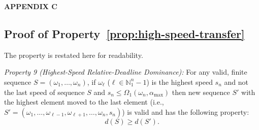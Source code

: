
\centerline{\large\bf APPENDIX C}

\label{appendix:engineControl}

\subsection{Proof of Property~\ref{prop:high-speed-transfer}}
The property is restated here for readability.

\emph{Property 9 (Highest-Speed Relative-Deadline Dominance):}
For any valid, finite sequence $S = (\omega_1, \ldots, \omega_n)$, if $\omega_\ell$ ($\ell \in \mathbb{N}_1^n-1$) is the highest speed $s_n$ and not the last speed of sequence $S$ and $s_n \leq \Omega_1(\omega_n,\alpha_{\max})$ then new sequence $S'$ with the highest element moved to the last element (i.e., $S' = (\omega_1, \ldots, \omega_{\ell-1}, \omega_{\ell+1}, \ldots, \omega_n, s_n)$) is valid and has the following property: 
\begin{equation}\label{eqn:high-speed-transfer-appendix}
    d(S) \geq d(S').
\end{equation}






